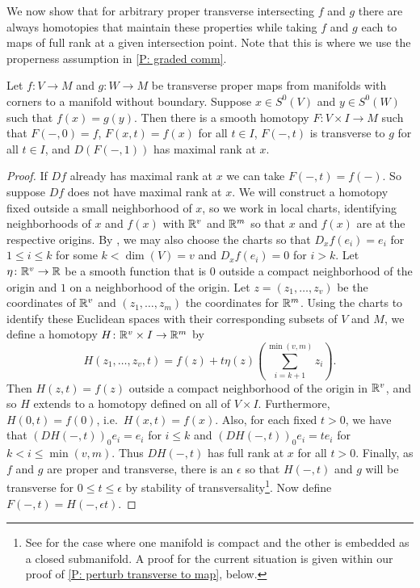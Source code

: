 We now show that for arbitrary proper transverse intersecting $f$ and $g$ there are always homotopies that maintain these properties while taking $f$ and $g$ each to maps of full rank at a given intersection point.
Note that this is where we use the properness assumption in \cref{P: graded comm}.

\begin{lemma}\label{L: make full}
	Let $f \colon V \to M$ and $g \colon W \to M$ be transverse proper maps from manifolds with corners to a manifold without boundary.
	Suppose $x \in S^0(V)$ and $y \in S^0(W)$ such that $f(x) = g(y)$.
	Then there is a smooth homotopy $F \colon V \times I \to M$ such that $F(-,0) = f$, $F(x,t) = f(x)$ for all $t \in I$, $F(-,t)$ is transverse to $g$ for all $t \in I$, and $D(F(-,1))$ has maximal rank at $x$.
\end{lemma}

\begin{proof}
	If $Df$ already has maximal rank at $x$ we can take $F(-,t) = f(-)$.
	So suppose $Df$ does not have maximal rank at $x$.
	We will construct a homotopy fixed outside a small neighborhood of $x$, so we work in local charts, identifying neighborhoods of $x$ and $f(x)$ with $\mathbb{R}^v$ and $\mathbb{R}^m$ so that $x$ and $f(x)$ are at the respective origins.
	By \cite[Sections 1.3-1.4]{GuPo74}, we may also choose the charts so that $D_xf(e_i) = e_i$ for $1 \leq i \leq k$ for some $k<\dim(V) = v$ and $D_xf(e_i) = 0$ for $i>k$.
	Let $\eta \colon \mathbb{R}^v \to \mathbb{R}$ be a smooth function that is $0$ outside a compact neighborhood of the origin and $1$ on a neighborhood of the origin.
	Let $z = (z_1,\ldots,z_v)$ be the coordinates of $\mathbb{R}^v$ and $(z_1, \ldots, z_m)$ the coordinates for $\mathbb{R}^m$.
	Using the charts to identify these Euclidean spaces with their corresponding subsets of $V$ and $M$, we define a homotopy $H \colon \mathbb{R}^v \times I \to \mathbb{R}^m$ by
	$$H(z_1,\ldots,z_v,t) = f(z) + t\eta(z)\left(\sum_{i = k+1}^{\min(v,m)} z_i\right).$$
	Then $H(z,t) = f(z)$ outside a compact neighborhood of the origin in $\mathbb{R}^v$, and so $H$ extends to a homotopy defined on all of $V \times I$.
	Furthermore, $H(0,t) = f(0)$, i.e.\ $H(x,t) = f(x)$.
	Also, for each fixed $t > 0$, we have that
	$(DH(-,t))_0e_i = e_i$ for $i \leq k$ and $(DH(-,t))_0e_i = te_i$ for $k<i \leq \min(v,m)$.
	Thus $DH(-,t)$ has full rank at $x$ for all $t>0$.
	Finally, as $f$ and $g$ are proper and transverse, there is an $\epsilon$ so that $H(-,t)$ and $g$ will be transverse for $0 \leq t \leq \epsilon$ by stability of transversality\footnote{See \cite[Theorem 1.6]{GuPo74} for the case where one manifold is compact and the other is embedded as a closed submanifold. A proof for the current situation is given within our proof of \cref{P: perturb transverse to map}, below.}.
	Now define $F(-,t) = H(-,\epsilon t)$.
\end{proof}

